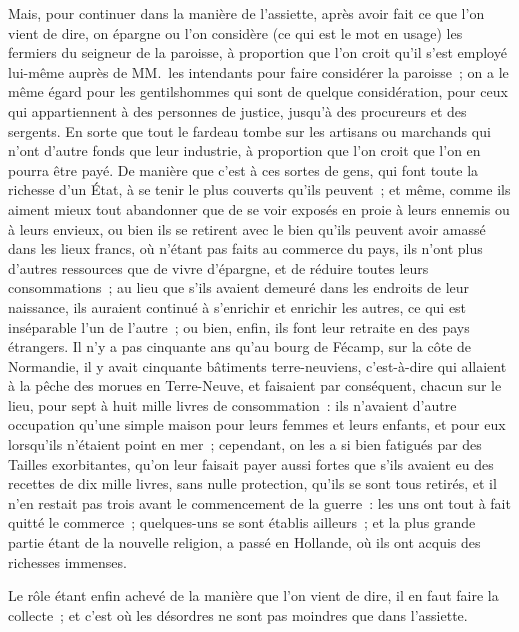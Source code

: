 \documentclass[french,twoside]{book} %
\begin{document}
Mais, pour continuer dans la manière de l’assiette, après avoir fait ce que l’on vient de dire, on épargne ou l’on considère (ce qui est le mot en usage) les fermiers du seigneur de la paroisse, à proportion que l’on croit qu’il s’est employé lui-même auprès de MM. les intendants pour faire considérer la paroisse ; on a le même égard pour les gentilshommes qui sont de quelque considération, pour ceux qui appartiennent à des personnes de justice, jusqu’à des procureurs et des sergents. En sorte que tout le fardeau tombe sur les artisans ou marchands qui n’ont d’autre fonds que leur industrie, à proportion que l’on croit que l’on en pourra être payé. De manière que c’est à ces sortes de gens, qui font toute la richesse d’un État, à se tenir le plus couverts qu’ils peuvent ; et même, comme ils aiment mieux tout abandonner que de se voir exposés en proie à leurs ennemis ou à leurs envieux, ou bien ils se retirent avec le bien qu’ils peuvent avoir amassé dans les lieux francs, où n’étant pas faits au commerce du pays, ils n’ont plus d’autres ressources que de vivre d’épargne, et de réduire toutes leurs consommations ; au lieu que s’ils avaient demeuré dans les endroits de leur naissance, ils auraient continué à s’enrichir et enrichir les autres, ce qui est inséparable l’un de l’autre ; ou bien, enfin, ils font leur retraite en des pays étrangers. Il n’y a pas cinquante ans qu’au bourg de Fécamp, sur la côte de Normandie, il y avait cinquante bâtiments terre-neuviens, c’est-à-dire qui allaient à la pêche des morues en Terre-Neuve, et faisaient par conséquent, chacun sur le lieu, pour sept à huit mille livres de consommation : ils n’avaient d’autre occupation qu’une simple maison pour leurs femmes et leurs enfants, et pour eux lorsqu’ils n’étaient point en mer ; cependant, on les a si bien fatigués par des Tailles exorbitantes, qu’on leur faisait payer aussi fortes que s’ils avaient eu des recettes de dix mille livres, sans nulle protection, qu’ils se sont tous retirés, et il n’en restait pas trois avant le commencement de la guerre : les uns ont tout à fait quitté le commerce ; quelques-uns se sont établis ailleurs ; et la plus grande partie étant de la nouvelle religion, a passé en Hollande, où ils ont acquis des richesses immenses.\par
Le rôle étant enfin achevé de la manière que l’on vient de dire, il en faut faire la collecte ; et c’est où les désordres ne sont pas moindres que dans l’assiette.
\end{document}
